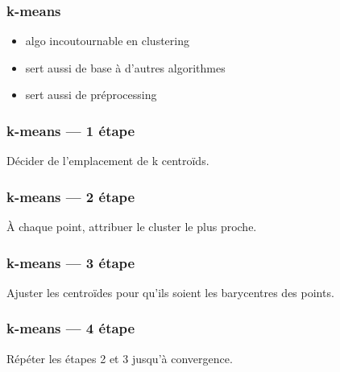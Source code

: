 \documentclass{formation}
\begin{document}
\begin{frame}
  \frametitle{k-means}

  \begin{itemize}[<+->]
  \item algo incoutournable en clustering
  \item sert aussi de base à d'autres algorithmes
  \item sert aussi de préprocessing
  \end{itemize}
\end{frame}

\begin{frame}
  \frametitle{k-means — 1\iere{} étape}


  Décider de l'emplacement de k centroïds.
\end{frame}

\begin{frame}
  \frametitle{k-means — 2\ieme{} étape}


  À chaque point, attribuer le cluster le plus proche.
\end{frame}

\begin{frame}
  \frametitle{k-means — 3\ieme{} étape}


  Ajuster les centroïdes pour qu'ils soient les barycentres des
  points.
\end{frame}

\begin{frame}
  \frametitle{k-means — 4\ieme{} étape}


  Répéter les étapes 2 et 3 jusqu'à convergence.
\end{frame}
\end{document}
